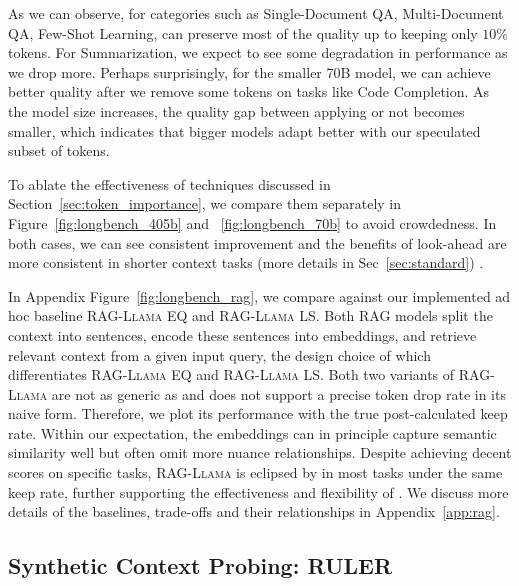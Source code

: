 As we can observe, for categories such as Single-Document QA, Multi-Document QA, Few-Shot Learning, \ours{} can preserve most of the quality up to keeping only $10\%$ tokens. For Summarization, we expect to see some degradation in performance as we drop more. Perhaps surprisingly, for the smaller 70B model, we can achieve better quality after we remove some tokens on tasks like Code Completion. As the model size increases, the quality gap between applying \ours{} or not becomes smaller, which indicates that bigger models adapt better with our speculated subset of tokens. 

To ablate the effectiveness of techniques discussed in Section~\ref{sec:token_importance}, we compare them separately in Figure~\ref{fig:longbench_405b} and ~\ref{fig:longbench_70b} to avoid crowdedness. In both cases, we can see consistent improvement and the benefits of look-ahead are more consistent in shorter context tasks (more details in Sec~\ref{sec:standard}) . 

In Appendix Figure~\ref{fig:longbench_rag}, we compare \ours{} against our implemented ad hoc baseline \textsc{RAG-Llama EQ} and \textsc{RAG-Llama LS}. Both RAG models split the context into sentences, encode these sentences into embeddings, and retrieve relevant context from a given input query, the design choice of which differentiates \textsc{RAG-Llama EQ} and \textsc{RAG-Llama LS}. Both two variants of \textsc{RAG-Llama} are not as generic as \ours{} and does not support a precise token drop rate in its naive form. Therefore, we plot its performance with the true post-calculated keep rate. Within our expectation, the embeddings can in principle capture semantic similarity well but often omit more nuance relationships. Despite achieving decent scores on specific tasks, \textsc{RAG-Llama} is eclipsed by \ours{} in most tasks under the same keep rate, further supporting the effectiveness and flexibility of \ours{}. We discuss more details of the baselines, trade-offs and their relationships in Appendix~\ref{app:rag}. 

\subsection{Synthetic Context Probing: RULER}

